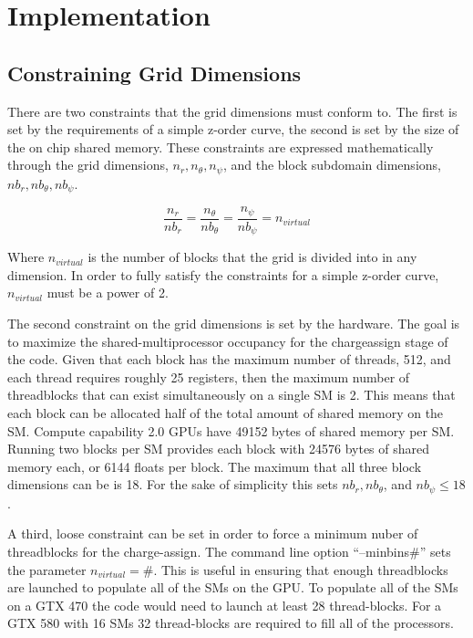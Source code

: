 \chapter{Implementation}

	\section{Constraining Grid Dimensions}
	\label{sec:grid_constraincts}
There are two constraints that the grid dimensions must conform to. The first is set by the requirements of a simple z-order curve, the second is set by the size of the on chip shared memory. These constraints are expressed mathematically through the grid dimensions, $n_r, n_{\theta}, n_{\psi}$, and the block subdomain dimensions, $nb_r, nb_{\theta}, nb_{\psi}$.
		
\begin{equation}
\frac{n_r}{nb_r} = \frac{n_{\theta}}{nb_{\theta}} = \frac{n_{\psi}}{nb_{\psi}} = n_{virtual}
\end{equation} 

Where $n_{virtual}$ is the number of blocks that the grid is divided into in any dimension. In order to fully satisfy the constraints for a simple z-order curve, $n_{virtual}$ must be a power of 2.

The second constraint on the grid dimensions is set by the hardware. The goal is to maximize the shared-multiprocessor occupancy for the chargeassign stage of the code. Given that each block has the maximum number of threads, 512, and each thread requires roughly 25 registers, then the maximum number of threadblocks that can exist simultaneously on a single SM is 2. This means that each block can be allocated half of the total amount of shared memory on the SM. Compute capability 2.0 GPUs have 49152 bytes of shared memory per SM. Running two blocks per SM provides each block with 24576 bytes of shared memory each, or 6144 floats per block. The maximum that all three block dimensions can be is 18. For the sake of simplicity this sets $nb_r, nb_{\theta}$, and $nb_{\psi} \le 18$. 

A third, loose constraint can be set in order to force a minimum nuber of threadblocks for the charge-assign. The command line option ``--minbins\#'' sets the parameter $n_{virtual} = \#$. This is useful in ensuring that enough threadblocks are launched to populate all of the SMs on the GPU. To populate all of the SMs on a GTX 470 the code would need to launch at least 28 thread-blocks. For a GTX 580 with 16 SMs 32 thread-blocks are required to fill all of the processors.  
